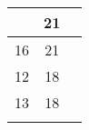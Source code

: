 \begin{table}[H]
\begin{tabularx}{\textwidth}{p{.1em}cc}
\begin{tabular}[t]{cc}
\multicolumn{1}{|c|}{15}                                                        & \multicolumn{1}{c|}{21}                                                             \\ \hline
\multicolumn{1}{|c|}{16}                                                        & \multicolumn{1}{c|}{21}                                                             \\ \hline
\multicolumn{1}{|c|}{12}                                                        & \multicolumn{1}{c|}{18}                                                             \\ \hline
\multicolumn{1}{|c|}{13}                                                        & \multicolumn{1}{c|}{18}                                                             \\ \hline
\end{tabular}

\end{tabularx}\end{table}